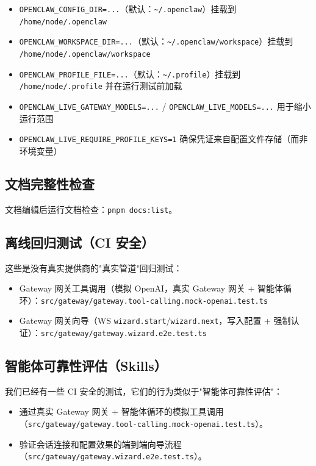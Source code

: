 \begin{itemize}
  \item \texttt{OPENCLAW\_CONFIG\_DIR=...}（默认：\texttt{\textasciitilde{}/.openclaw}）挂载到 \texttt{/home/node/.openclaw}
  \item \texttt{OPENCLAW\_WORKSPACE\_DIR=...}（默认：\texttt{\textasciitilde{}/.openclaw/workspace}）挂载到 \texttt{/home/node/.openclaw/workspace}
  \item \texttt{OPENCLAW\_PROFILE\_FILE=...}（默认：\texttt{\textasciitilde{}/.profile}）挂载到 \texttt{/home/node/.profile} 并在运行测试前加载
  \item \texttt{OPENCLAW\_LIVE\_GATEWAY\_MODELS=...} / \texttt{OPENCLAW\_LIVE\_MODELS=...} 用于缩小运行范围
  \item \texttt{OPENCLAW\_LIVE\_REQUIRE\_PROFILE\_KEYS=1} 确保凭证来自配置文件存储（而非环境变量）
\end{itemize}


\subsection{文档完整性检查}


文档编辑后运行文档检查：\texttt{pnpm docs:list}。

\subsection{离线回归测试（CI 安全）}


这些是没有真实提供商的"真实管道"回归测试：

\begin{itemize}
  \item Gateway 网关工具调用（模拟 OpenAI，真实 Gateway 网关 + 智能体循环）：\texttt{src/gateway/gateway.tool-calling.mock-openai.test.ts}
  \item Gateway 网关向导（WS \texttt{wizard.start}/\texttt{wizard.next}，写入配置 + 强制认证）：\texttt{src/gateway/gateway.wizard.e2e.test.ts}
\end{itemize}


\subsection{智能体可靠性评估（Skills）}


我们已经有一些 CI 安全的测试，它们的行为类似于"智能体可靠性评估"：

\begin{itemize}
  \item 通过真实 Gateway 网关 + 智能体循环的模拟工具调用（\texttt{src/gateway/gateway.tool-calling.mock-openai.test.ts}）。
  \item 验证会话连接和配置效果的端到端向导流程（\texttt{src/gateway/gateway.wizard.e2e.test.ts}）。
\end{itemize}


